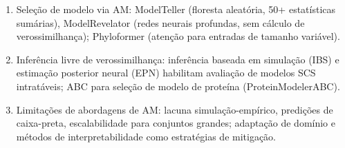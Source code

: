 \begin{revise}
\begin{enumerate}[itemsep=0pt, topsep=0pt, parsep=0pt]
    \item Seleção de modelo via AM: ModelTeller (floresta aleatória, 50+ estatísticas sumárias), ModelRevelator (redes neurais profundas, sem cálculo de verossimilhança); Phyloformer (atenção para entradas de tamanho variável).
    \item Inferência livre de verossimilhança: inferência baseada em simulação (IBS) e estimação posterior neural (EPN) habilitam avaliação de modelos SCS intratáveis; ABC para seleção de modelo de proteína (ProteinModelerABC).
    \item Limitações de abordagens de AM: lacuna simulação-empírico, predições de caixa-preta, escalabilidade para conjuntos grandes; adaptação de domínio e métodos de interpretabilidade como estratégias de mitigação.
\end{enumerate}
\end{revise}

\clearpage

\printbibliography[heading=subbibliography,title={Referências}]

